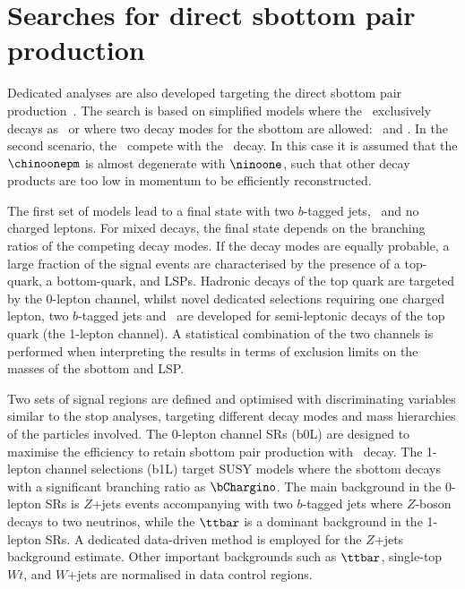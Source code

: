 \documentclass[UKenglish,10pt]{article}
\begin{document}
\section{Searches for direct sbottom pair production}

Dedicated analyses are also developed targeting the direct sbottom pair production~\cite{ATL-CONF-2017-039}. The search is based on simplified models where the \bone\ exclusively decays as \bottomLSP\ or where two decay modes for the sbottom are allowed: \bottomLSP\ and \tChargino. In the second scenario, the \bottomLSP\ compete with the \tChargino\ decay. In this case it is assumed that the $\chinoonepm$ is almost degenerate with $\ninoone$, such that other decay products are too low in momentum to be efficiently reconstructed.
\vspace{0.20cm}

\hspace{-0.60cm}
The first set of models lead to a final state with two $b$-tagged jets, \met\ and no charged leptons. For mixed decays, the final state depends on the branching ratios of the competing decay modes. If the decay modes are equally probable, a large fraction of the signal events are characterised by the presence of a top-quark, a bottom-quark, and LSPs. Hadronic decays of the top quark are targeted by the 0-lepton channel, whilst novel dedicated selections requiring one charged lepton, two $b$-tagged jets and \met\ are developed for semi-leptonic decays of the top quark (the 1-lepton channel). A statistical combination of the two channels is performed when interpreting the results in terms of exclusion limits on the masses of the sbottom and LSP.
\vspace{0.20cm}

\hspace{-0.60cm}
Two sets of signal regions are defined and optimised with discriminating variables similar to the stop analyses, targeting different decay modes and mass hierarchies of the particles involved. The 0-lepton channel SRs (b0L) are designed to maximise the efficiency to retain sbottom pair production with \bottomLSP\ decay. The 1-lepton channel selections (b1L) target SUSY models where the sbottom decays with a significant branching ratio as $\bChargino$. The main background in the 0-lepton SRs is $Z$+jets events accompanying with two $b$-tagged jets where $Z$-boson decays to two neutrinos, while the $\ttbar$ is a dominant background in the 1-lepton SRs. A dedicated data-driven method is employed for the $Z$+jets background estimate. Other important backgrounds such as $\ttbar$, single-top $Wt$, and $W$+jets are normalised in data control regions. 
\end{document}
